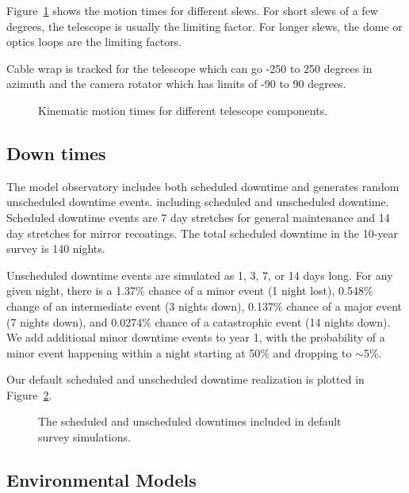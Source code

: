\documentclass[]{aastex631}
\begin{document}
Figure~\ref{fig:motion_times} shows the motion times for different slews. For short slews of a few degrees, the telescope is usually the limiting factor. For longer slews, the dome or optics loops are the limiting factors. 

Cable wrap is tracked for the telescope which can go -250 to 250 degrees in azimuth and the camera rotator which has limits of -90 to 90 degrees. 

\begin{figure}
    \caption{Kinematic motion times for different telescope components.  \label{fig:motion_times}}
\end{figure}

\subsection{Down times}

The model observatory includes both scheduled downtime and generates random unscheduled downtime events.  
including scheduled and unscheduled downtime. 
Scheduled downtime events are 7 day stretches for general maintenance and 14 day stretches for mirror recoatings. The total scheduled downtime in the 10-year survey is 140 nights. 

Unscheduled downtime events are simulated as 1, 3, 7, or 14 days long. For any given night, there is a 1.37\% chance of a minor event (1 night lost), 0.548\% change of an intermediate event (3 nights down), 0.137\% chance of a major event (7 nights down), and 0.0274\% chance of a catastrophic event (14 nights down). We add additional minor downtime events to year 1, with the probability of a minor event happening within a night starting at 50\% and dropping to $\sim$5\%. 

Our default scheduled and unscheduled downtime realization is plotted in Figure~\ref{fig:downtimes}.

\begin{figure}
    \centering
    \caption{The scheduled and unscheduled downtimes included in default survey simulations. \label{fig:downtimes}}
\end{figure}

\subsection{Environmental Models}
\end{document}
